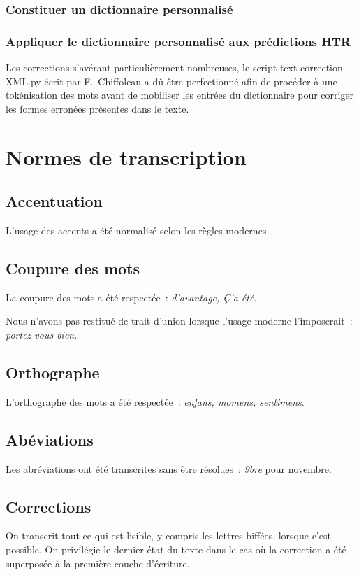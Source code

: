 \documentclass[a4paper,12pt,twoside]{book}
\begin{document}
			\subsection{Constituer un dictionnaire personnalisé}

			\subsection{Appliquer le dictionnaire personnalisé aux prédictions HTR}
				Les corrections s'avérant particulièrement nombreuses, le script \textsf{text-correction-XML.py} écrit par F.~Chiffoleau a dû être perfectionné afin de procéder à une tokénisation des mots avant de mobiliser les entrées du dictionnaire pour corriger les formes erronées présentes dans le texte.
				
	\appendix
	
	\renewcommand{\appendixpagename}{Annexes}
	
	\renewcommand{\appendixtocname}{Annexes}
	
	\addappheadtotoc%
	
	\appendixpage %
	\chapter{Normes de transcription}
	
		\section{Accentuation}
		L'usage des accents a été normalisé selon les règles modernes.
		
		\section{Coupure des mots}
		La coupure des mots a été respectée~: \textit{d'avantage, Ç'a été}.
		
		Nous n'avons pas restitué de trait d'union lorsque l'usage moderne l'imposerait~: \textit{portez vous bien}.
				
		\section{Orthographe}
		L'orthographe des mots a été respectée~: \textit{enfans, momens, sentimens}.
		
		\section{Abéviations}
		Les abréviations ont été transcrites sans être résolues~: \textit{9bre} pour novembre.
		
		\section{Corrections}
		On transcrit tout ce qui est lisible, y compris les lettres biffées, lorsque c'est possible. On privilégie le dernier état du texte dans le cas où la correction a été superposée à la première couche d'écriture.
           	
\end{document}

